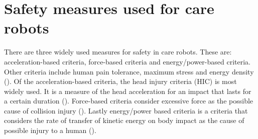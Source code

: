 \documentclass[12pt]{scrreprt}
\begin{document}
 \section{Safety measures used for care robots}
 \label{Safety in care robots}
There are three widely used measures for safety in care robots. These are: acceleration-based criteria,  force-based criteria and energy/power-based criteria. Other criteria include human pain tolerance, maximum stress and energy density (\cite{tadele}). Of the acceleration-based criteria, the head injury criteria (HIC) is most widely used. It is a measure of the head acceleration for an impact that lasts for a certain duration (\cite{hic}). Force-based criteria consider excessive force as the possible cause of collision injury (\cite{force}). Lastly energy/power based criteria is a criteria that considers the rate of transfer of kinetic energy on body impact as the cause of possible injury to a human (\cite{crucial_milestone}).

 
\end{document}
